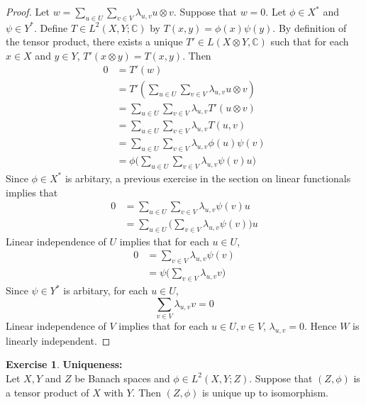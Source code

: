 \documentclass[12pt]{amsart}
\theoremstyle{definition}
\newtheorem{ex}[definition]{Exercise}
\newcommand{\lam}{\lambda}
\newcommand{\C}{\mathbb{C}}
\newcommand{\tbf}[1]{\textbf{#1}}
\DeclareMathOperator*{\0}{\mbf{0}}
\DeclareMathOperator*{\1}{\mbf{1}}
\begin{document}
	\begin{proof}
	Let $w = \sum\limits_{u \in U} \sum\limits_{v \in V}\lam_{u,v} u \otimes v$. Suppose that $w = 0$. Let $\phi \in X^*$ and $\psi \in Y^*$. Define $T \in L^2(X, Y; \C)$ by $T(x,y) = \phi(x)\psi(y)$. By definition of the tensor product, there exists a unique $T' \in L(X \otimes Y, \C)$ such that for each $x \in X$ and $y \in Y$, $T'(x \otimes y) = T(x,y)$. Then 
	\begin{align*}
	0 
	&= T'(w) \\
	&= T'(\sum\limits_{u \in U} \sum\limits_{v \in V}\lam_{u,v} u \otimes v) \\
	&= \sum\limits_{u \in U} \sum\limits_{v \in V}\lam_{u,v} T'(u \otimes v) \\
	&= \sum\limits_{u \in U} \sum\limits_{v \in V}\lam_{u,v} T(u, v) \\
	&= \sum\limits_{u \in U} \sum\limits_{v \in V}\lam_{u,v} \phi(u)\psi(v) \\
	&= \phi\bigg( \sum\limits_{u \in U} \sum\limits_{v \in V}\lam_{u,v}  \psi(v) u \bigg)
	\end{align*}
	Since $\phi \in X^*$ is arbitary, a previous exercise in the section on linear functionals implies that 
	\begin{align*}
	0 
	&= \sum\limits_{u \in U} \sum\limits_{v \in V}\lam_{u,v}  \psi(v) u \\
	&= \sum\limits_{u \in U} \bigg (\sum\limits_{v \in V}\lam_{u,v}  \psi(v)  \bigg) u
	\end{align*}
	Linear independence of $U$ implies that for each $u \in U$, 
	\begin{align*}
	0 
	&= \sum\limits_{v \in V}\lam_{u,v}  \psi(v) \\
	&= \psi \bigg( \sum\limits_{v \in V}\lam_{u,v}  v \bigg )
	\end{align*}
	Since $\psi \in Y^*$ is arbitary, for each $u \in U$, $$\sum\limits_{v \in V}\lam_{u,v}  v = 0$$
	Linear independence of $V$ implies that for each $u \in U, v \in V$, $\lam_{u,v} = 0$. Hence $W$ is linearly independent. 
	\end{proof}
	
	\begin{ex} \tbf{Uniqueness:}\\
	Let $X, Y$ and $Z$ be Banach spaces and $\phi \in L^2(X,Y ; Z)$. Suppose that $(Z, \phi)$ is a tensor product of $X$ with $Y$. Then $(Z, \phi)$ is unique up to isomorphism. 
	\end{ex}
	
\end{document}
